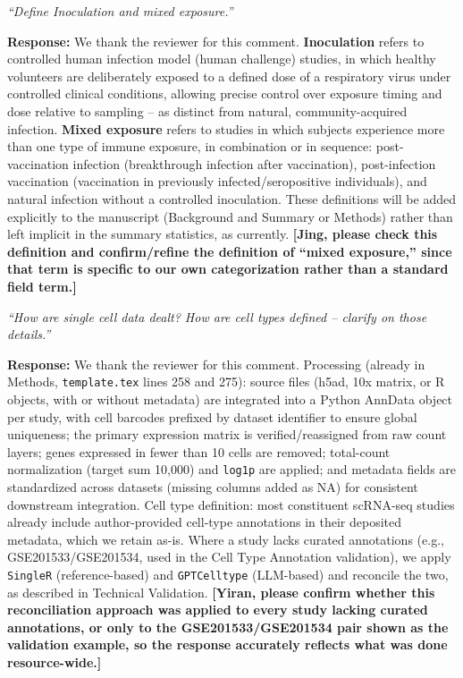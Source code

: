 \documentclass[11pt]{article}
\newcommand{\origcomment}[1]{\textit{``#1''}}
\newcommand{\filledresponse}[1]{%
  \par\medskip\noindent\textbf{Response:} #1\par
  \vspace{0.4cm}%
  \par\noindent\hrulefill\par\bigskip
}
\begin{document}
\begin{commentlist}
\item[R1-4.] \origcomment{Define Inoculation and mixed exposure.}
\filledresponse{We thank the reviewer for this comment. \textbf{Inoculation} refers to controlled human infection model (human challenge)
studies, in which healthy volunteers are deliberately exposed to a defined dose of a respiratory
virus under controlled clinical conditions, allowing precise control over exposure timing and dose
relative to sampling -- as distinct from natural, community-acquired infection. \textbf{Mixed
exposure} refers to studies in which subjects experience more than one type of immune exposure,
in combination or in sequence: post-vaccination infection (breakthrough infection after
vaccination), post-infection vaccination (vaccination in previously infected/seropositive
individuals), and natural infection without a controlled inoculation. These definitions will be
added explicitly to the manuscript (Background and Summary or Methods) rather than left implicit in
the summary statistics, as currently. \textbf{[Jing, please check this definition and confirm/refine
the definition of ``mixed exposure,'' since that term is specific to our own categorization rather
than a standard field term.]}}

\item[R1-5.] \origcomment{How are single cell data dealt? How are cell types defined -- clarify on
those details.}
\filledresponse{We thank the reviewer for this comment. Processing (already in Methods, \texttt{template.tex} lines 258 and 275): source
files (h5ad, 10x matrix, or R objects, with or without metadata) are integrated into a Python
AnnData object per study, with cell barcodes prefixed by dataset identifier to ensure global
uniqueness; the primary expression matrix is verified/reassigned from raw count layers; genes
expressed in fewer than 10 cells are removed; total-count normalization (target sum 10,000) and
\texttt{log1p} are applied; and metadata fields are standardized across datasets (missing columns
added as NA) for consistent downstream integration. Cell type definition: most constituent
scRNA-seq studies already include author-provided cell-type annotations in their deposited
metadata, which we retain as-is. Where a study lacks curated annotations (e.g., GSE201533/GSE201534,
used in the Cell Type Annotation validation), we apply \texttt{SingleR} (reference-based) and
\texttt{GPTCelltype} (LLM-based) and reconcile the two, as described in Technical Validation.
\textbf{[Yiran, please confirm whether this reconciliation approach was applied to every study
lacking curated annotations, or only to the GSE201533/GSE201534 pair shown as the validation
example, so the response accurately reflects what was done resource-wide.]}}


\end{commentlist}
\end{document}
